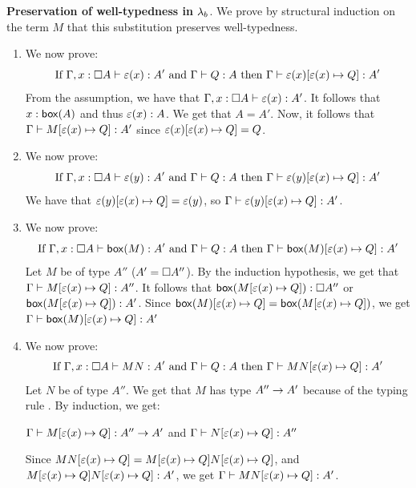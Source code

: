 \begin{proofthm}
  \textbf{Preservation of well-typedness in \boldmath${\lambda_b}$}. We prove by structural induction on the term $M$ that this substitution preserves well-typedness.
  \begin{enumerate}
    \item%
 We now prove:
    \[
 \mbox{If } \hspace{0.0em} {\Gamma, x : \square{A}} \vdash {\varepsilon(x) : A'} \hspace{0.0em} \mbox{ and } \hspace{0.0em} {\Gamma} \vdash {Q : A} \hspace{0.0em} \mbox{ then } \hspace{0.0em} {\Gamma} \vdash {\varepsilon(x)  [{\varepsilon(x)}\mapsto{Q}]  : A'} \hspace{0.0em}
    \]
 From the assumption, we have that $\hspace{0.0em} {\Gamma, x : \square{A}} \vdash {\varepsilon(x) : A'} \hspace{0.0em}$.
 It follows that $x : \mathsf{box}({A})$ and thus $\varepsilon(x) : A$. We get that $A = A'$. 
 Now, it follows that $\hspace{0.0em} {\Gamma} \vdash {M  [{\varepsilon(x)}\mapsto{Q}]  : A'} \hspace{0.0em}$ since $\varepsilon(x) [{\varepsilon(x)}\mapsto{Q}] = Q$.
    \item%
 We now prove:
    \[
 \mbox{If } \hspace{0.0em} {\Gamma, x : \square{A}} \vdash {\varepsilon(y) : A'} \hspace{0.0em} \mbox{ and } \hspace{0.0em} {\Gamma} \vdash {Q : A} \hspace{0.0em} \mbox{ then } \hspace{0.0em} {\Gamma} \vdash {\varepsilon(y)  [{\varepsilon(x)}\mapsto{Q}]  : A'} \hspace{0.0em}
    \]
 We have that $\varepsilon(y) [{\varepsilon(x)}\mapsto{Q}] = \varepsilon(y)$, so $\hspace{0.0em} {\Gamma} \vdash {\varepsilon(y)  [{\varepsilon(x)}\mapsto{Q}]  : A'} \hspace{0.0em}$.    
    \item%
 We now prove:
    \[
 \mbox{If } \hspace{0.0em} {\Gamma, x : \square{A}} \vdash {\mathsf{box}({M}) : A'} \hspace{0.0em} \mbox{ and } \hspace{0.0em} {\Gamma} \vdash {Q : A} \hspace{0.0em} \mbox{ then } \hspace{0.0em} {\Gamma} \vdash {\mathsf{box}({M})  [{\varepsilon(x)}\mapsto{Q}]  : A'} \hspace{0.0em}
    \]
 Let $M$ be of type $A''$ ($A' = \square{A''}$). By the induction hypothesis, we get that $\hspace{0.0em} {\Gamma} \vdash {M  [{\varepsilon(x)}\mapsto{Q}]  : A''} \hspace{0.0em}$.
 It follows that $\mathsf{box}({M [{\varepsilon(x)}\mapsto{Q}]}) : \square{A''}$ or $\mathsf{box}({M [{\varepsilon(x)}\mapsto{Q}]}) : A'$.
 Since $\mathsf{box}({M}) [{\varepsilon(x)}\mapsto{Q}] = \mathsf{box}({M [{\varepsilon(x)}\mapsto{Q}]})$, we get $\hspace{0.0em} {\Gamma} \vdash {\mathsf{box}({M})  [{\varepsilon(x)}\mapsto{Q}]  : A'} \hspace{0.0em}$ 
    \item%
 We now prove:
    \[
 \mbox{If } \hspace{0.0em} {\Gamma, x : \square{A}} \vdash {M N : A'} \hspace{0.0em} \mbox{ and } \hspace{0.0em} {\Gamma} \vdash {Q : A} \hspace{0.0em} \mbox{ then } \hspace{0.0em} {\Gamma} \vdash {M N  [{\varepsilon(x)}\mapsto{Q}]  : A'} \hspace{0.0em}
    \]
 Let $N$ be of type $A''$. We get that $M$ has type $A'' \to A'$ because of the typing rule \impliese.
 By induction, we get: 
    \begin{center}  
    $\hspace{0.0em} {\Gamma} \vdash {M  [{\varepsilon(x)}\mapsto{Q}] } \hspace{0.0em} : A'' \to A'$ and $\hspace{0.0em} {\Gamma} \vdash {N  [{\varepsilon(x)}\mapsto{Q}] } \hspace{0.0em} : A''$
    \end{center}
 Since $M N [{\varepsilon(x)}\mapsto{Q}] = M [{\varepsilon(x)}\mapsto{Q}] N [{\varepsilon(x)}\mapsto{Q}]$, and \\
    $M [{\varepsilon(x)}\mapsto{Q}] N [{\varepsilon(x)}\mapsto{Q}] : A'$, we get
    $\hspace{0.0em} {\Gamma} \vdash {M N  [{\varepsilon(x)}\mapsto{Q}]  : A'} \hspace{0.0em}$.

\end{enumerate}
\end{proofthm}
